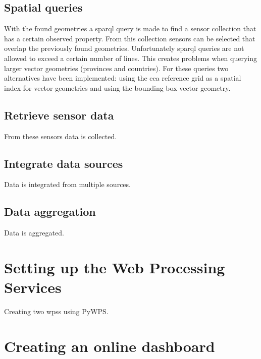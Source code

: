 \subsection{Spatial queries}
With the found geometries a \ac{sparql} query is made to find a sensor collection that has a certain observed property. From this collection sensors can be selected that overlap the previously found geometries. Unfortunately \ac{sparql} queries are not allowed to exceed a certain number of lines. This creates problems when querying larger vector geometries (provinces and countries). For these queries two alternatives have been implemented: using the \ac{eea} reference grid as a spatial index for vector geometries and using the bounding box vector geometry. \\

\subsection{Retrieve sensor data}
From these sensors data is collected. \\

\subsection{Integrate data sources}
Data is integrated from multiple sources.\\

\subsection{Data aggregation}
Data is aggregated.

\section{Setting up the Web Processing Services}
Creating two \aclp{wps} using PyWPS.

\section{Creating an online dashboard}
